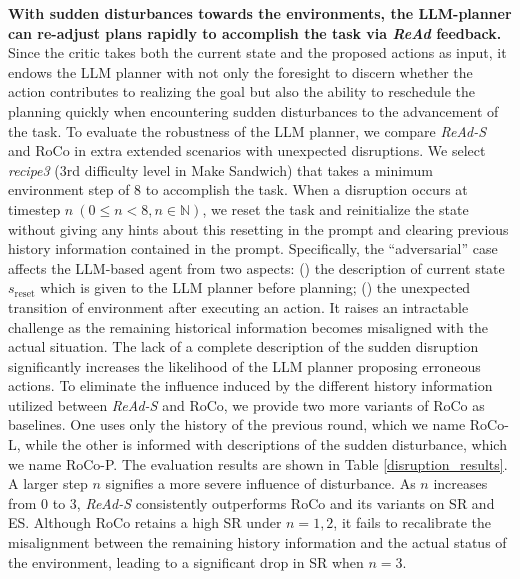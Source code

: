 \documentclass[11pt]{article}
\theoremstyle{plain}
\theoremstyle{remark}
\begin{document}
\textbf{With sudden disturbances towards the environments, the LLM-planner can re-adjust plans rapidly to accomplish the task via \emph{ReAd} feedback.} Since the critic takes both the current state and the proposed actions as input, it endows the LLM planner with not only the foresight to discern whether the action contributes to realizing the goal but also the ability to reschedule the planning quickly when encountering sudden disturbances to the advancement of the task. To evaluate the robustness of the LLM planner, we compare \emph{ReAd-S} and RoCo in extra extended scenarios with unexpected disruptions.
We select \emph{recipe3} (3rd difficulty level in Make Sandwich) that takes a minimum environment step of 8 to accomplish the task. When a disruption occurs at timestep $n \ (0 \leq n < 8, n \in \mathbb{N})$, we reset the task and reinitialize the state without giving any hints about this resetting in the prompt and clearing previous history information contained in the prompt. Specifically, the ``adversarial'' case affects the LLM-based agent from two aspects: () the description of current state $s_{\text{reset}}$ which is given to the LLM planner before planning; () the unexpected transition of environment after executing an 
action.
It raises an intractable challenge as the remaining historical information becomes misaligned with the actual situation. The lack of a complete description of the sudden disruption significantly increases the likelihood of the LLM planner proposing erroneous actions.
To eliminate the influence induced by the different history information utilized between \emph{ReAd-S} and RoCo, we provide two more variants of RoCo as baselines. One uses only the history of the previous round, which we name RoCo-L, while the other is informed with descriptions of the sudden disturbance, which we name RoCo-P.
The evaluation results are shown in Table \ref{disruption_results}. A larger step $n$ signifies a more severe influence of disturbance. As $n$ increases from 0 to 3, \emph{ReAd-S} consistently outperforms RoCo and its variants on SR and ES. Although RoCo retains a high SR under $n = 1, 2$, it fails to recalibrate the misalignment between the remaining history information and the actual status of the environment, leading to a significant drop in SR when $n = 3$.
\end{document}
